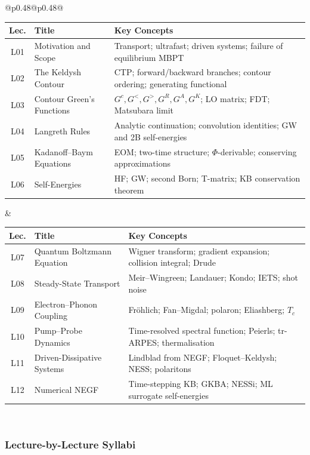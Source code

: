 \documentclass[11pt,a4paper]{article}
\begin{document}
\begin{center}
\begin{tabular}{@{}p{}@{\textwidth}p{}@{}}
\begin{tabular}[t]{@{}clp{4.5cm}@{}}
\toprule
\textbf{Lec.} & \textbf{Title} & \textbf{Key Concepts}\\
\midrule
L01 & Motivation and Scope & Transport; ultrafast; driven systems; failure of equilibrium MBPT\\
L02 & The Keldysh Contour & CTP; forward/backward branches; contour ordering; generating functional\\
L03 & Contour Green's Functions & $G^c,G^<,G^>,G^R,G^A,G^K$; LO matrix; FDT; Matsubara limit\\
L04 & Langreth Rules & Analytic continuation; convolution identities; GW and 2B self-energies\\
L05 & Kadanoff--Baym Equations & EOM; two-time structure; $\Phi$-derivable; conserving approximations\\
L06 & Self-Energies & HF; GW; second Born; T-matrix; KB conservation theorem\\
\bottomrule
\end{tabular}
&
\begin{tabular}[t]{@{}clp{4.5cm}@{}}
\toprule
\textbf{Lec.} & \textbf{Title} & \textbf{Key Concepts}\\
\midrule
L07 & Quantum Boltzmann Equation & Wigner transform; gradient expansion; collision integral; Drude\\
L08 & Steady-State Transport & Meir--Wingreen; Landauer; Kondo; IETS; shot noise\\
L09 & Electron--Phonon Coupling & Fr\"ohlich; Fan--Migdal; polaron; Eliashberg; $T_c$\\
L10 & Pump--Probe Dynamics & Time-resolved spectral function; Peierls; tr-ARPES; thermalisation\\
L11 & Driven-Dissipative Systems & Lindblad from NEGF; Floquet--Keldysh; NESS; polaritons\\
L12 & Numerical NEGF & Time-stepping KB; GKBA; NESSi; ML surrogate self-energies\\
\bottomrule
\end{tabular}
\\
\end{tabular}
\end{center}

\subsubsection*{Lecture-by-Lecture Syllabi}
\end{document}
